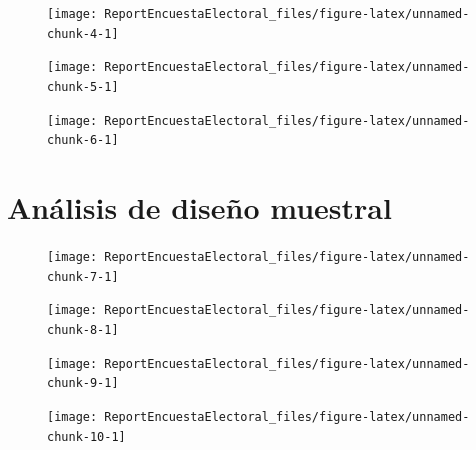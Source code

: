 \documentclass[10,a4paperpaper,]{article}
\begin{document}
\begin{figure}[!htb]
  \begin{minipage}{0.3\textwidth}
    \centering

\texttt{[image: ReportEncuestaElectoral\_files/figure-latex/unnamed-chunk-4-1]} 
  \end{minipage}\hfill
  \begin{minipage}{0.3\textwidth}
    \centering

\texttt{[image: ReportEncuestaElectoral\_files/figure-latex/unnamed-chunk-5-1]} 
  \end{minipage}
  \begin{minipage}{0.3\textwidth}
    \centering

\texttt{[image: ReportEncuestaElectoral\_files/figure-latex/unnamed-chunk-6-1]} 
  \end{minipage}
\end{figure}

\newpage

\section{Análisis de diseño muestral}

\begin{figure}[!htb]
    \begin{minipage}{0.5\textwidth}
      \centering

\texttt{[image: ReportEncuestaElectoral\_files/figure-latex/unnamed-chunk-7-1]} 
    \end{minipage}\hfill
    \begin{minipage}{0.5\textwidth}
      \centering

\texttt{[image: ReportEncuestaElectoral\_files/figure-latex/unnamed-chunk-8-1]} 
    \end{minipage}
\end{figure}

\begin{figure}[!htb]
  \begin{minipage}{0.5\textwidth}
    \centering

\texttt{[image: ReportEncuestaElectoral\_files/figure-latex/unnamed-chunk-9-1]} 
    \end{minipage}\hfill
  \begin{minipage}{0.5\textwidth}
    \centering

\texttt{[image: ReportEncuestaElectoral\_files/figure-latex/unnamed-chunk-10-1]} 
  \end{minipage}
\end{figure}
\end{document}
